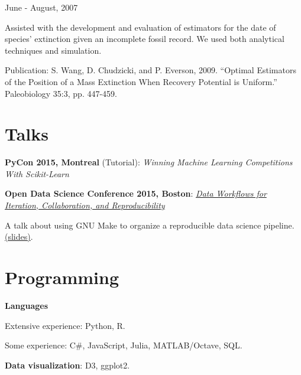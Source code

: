 \documentclass[letterpaper]{resume}
\begin{document}
{June - August, 2007}
{}
{}
\begin{compactitem}
\item Assisted with the development and evaluation of estimators for the
date of species' extinction given an incomplete fossil record. We used
both analytical techniques and simulation.

\begin{compactitem}

\item Publication: S. Wang, D. Chudzicki, and P. Everson, 2009. ``Optimal Estimators of the Position of a Mass Extinction When Recovery Potential is Uniform.'' Paleobiology 35:3, pp. 447-459. 

\end{compactitem}

\end{compactitem}

\section{Talks}

\begin{compactitem}
\item \textbf{PyCon 2015, Montreal} (Tutorial): \textit{Winning Machine Learning Competitions With Scikit-Learn}
\item \textbf{Open Data Science Conference 2015, Boston}: \textit{\href{http://opendatascicon.com/schedule/data-workflows-for-iteration-collaboration-and-reproducibility/}{Data Workflows for Iteration, Collaboration, and Reproducibility}}
\begin{compactitem}
\item A talk about using GNU Make to organize a reproducible data science pipeline. \href{http://www.davidchudzicki.com/slides/odsc-2015-workflow/}{(slides)}.
\end{compactitem}
\end{compactitem}




\section{Programming}
\vspace{1pt}
\begin{compactitem}
\item \textbf{Languages} 
\begin{compactitem}
\item Extensive experience: Python, R.
\item Some experience: C\#, JavaScript, Julia, MATLAB/Octave, SQL.
\end{compactitem}
\item \textbf{Data visualization}: D3, ggplot2.
\end{compactitem}
\end{document}
